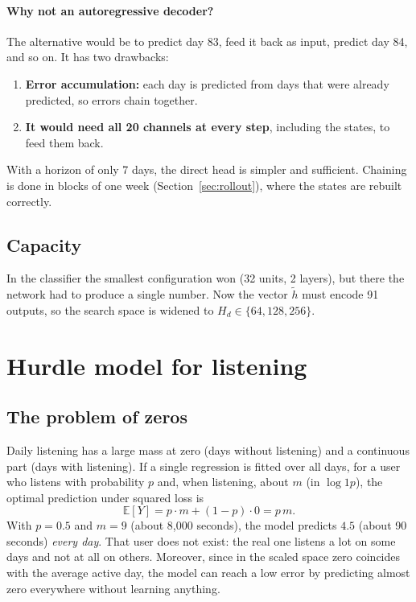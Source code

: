 \documentclass[11pt]{article}
\newcommand{\E}{\mathbb{E}}
\begin{document}
\paragraph{Why not an autoregressive decoder?} The alternative would be to predict day 83, feed it back as input, predict day 84, and so on. It has two drawbacks:
\begin{enumerate}
  \item \textbf{Error accumulation:} each day is predicted from days that were already predicted, so errors chain together.
  \item \textbf{It would need all 20 channels at every step}, including the states, to feed them back.
\end{enumerate}
With a horizon of only 7 days, the direct head is simpler and sufficient. Chaining is done in blocks of one week (Section~\ref{sec:rollout}), where the states are rebuilt correctly.

\subsection{Capacity}

In the classifier the smallest configuration won (32 units, 2 layers), but there the network had to produce a single number. Now the vector $\tilde h$ must encode 91 outputs, so the search space is widened to $H_d \in \{64, 128, 256\}$.

\section{Hurdle model for listening}
\label{sec:hurdle}

\subsection{The problem of zeros}

Daily listening has a large mass at zero (days without listening) and a continuous part (days with listening). If a single regression is fitted over all days, for a user who listens with probability $p$ and, when listening, about $m$ (in $\log 1p$), the optimal prediction under squared loss is
\begin{equation}
\E[Y] = p \cdot m + (1 - p) \cdot 0 = p\,m.
\end{equation}
With $p = 0.5$ and $m = 9$ (about 8{,}000 seconds), the model predicts $4.5$ (about 90 seconds) \emph{every day}. That user does not exist: the real one listens a lot on some days and not at all on others. Moreover, since in the scaled space zero coincides with the average active day, the model can reach a low error by predicting almost zero everywhere without learning anything.
\end{document}

